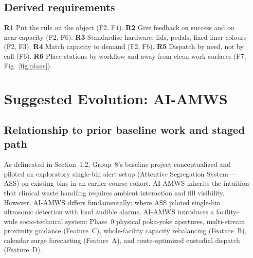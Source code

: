 \documentclass[10pt,twocolumn,a4paper]{article}
\newcommand{\figref}[1]{Fig.~\ref{#1}}
\begin{document}
\subsection{Derived requirements}
\textbf{R1} Put the rule on the object (F2, F4). \textbf{R2} Give feedback on success and on near-capacity (F2, F6). \textbf{R3} Standardise hardware: lids, pedals, fixed liner colours (F2, F3). \textbf{R4} Match capacity to demand (F2, F6). \textbf{R5} Dispatch by need, not by call (F6). \textbf{R6} Place stations by workflow and away from clean work surfaces (F7, \figref{fig:plans}).

\section{Suggested Evolution: AI-AMWS}
\subsection{Relationship to prior baseline work and staged path}
As delineated in Section~1.2, Group~8's baseline project conceptualized and piloted an exploratory single-bin alert setup (Attentive Segregation System\,---\,ASS) on existing bins in an earlier course cohort. AI-AMWS inherits the intuition that clinical waste handling requires ambient interaction and fill visibility. However, AI-AMWS differs fundamentally: where ASS piloted single-bin ultrasonic detection with loud audible alarms, AI-AMWS introduces a facility-wide socio-technical system: Phase~0 physical poka-yoke apertures, multi-stream proximity guidance (Feature~C), whole-facility capacity rebalancing (Feature~B), calendar surge forecasting (Feature~A), and route-optimized custodial dispatch (Feature~D).
\end{document}
